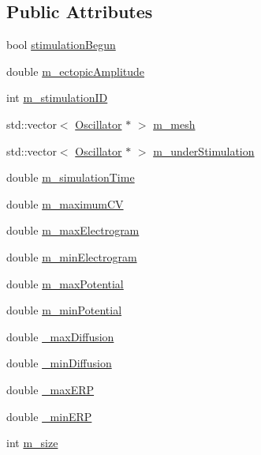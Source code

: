 \subsection*{Public Attributes}
\begin{DoxyCompactItemize}
\item 
bool \hyperlink{class_cardiac_mesh_ac14b1f228c8426e067df4a925824348e}{stimulation\+Begun}
\item 
double \hyperlink{class_cardiac_mesh_a4eeec3a9a09b9bc7e68ca3f7b34ea36c}{m\+\_\+ectopic\+Amplitude}
\item 
int \hyperlink{class_cardiac_mesh_a196d79c37896623ae3957949525c1e1d}{m\+\_\+stimulation\+I\+D}
\item 
std\+::vector$<$ \hyperlink{class_oscillator}{Oscillator} $\ast$ $>$ \hyperlink{class_cardiac_mesh_acd49de8f8f878f45c927d4b75851ced6}{m\+\_\+mesh}
\item 
std\+::vector$<$ \hyperlink{class_oscillator}{Oscillator} $\ast$ $>$ \hyperlink{class_cardiac_mesh_a21749f0b4af8fe59552f97058982f695}{m\+\_\+under\+Stimulation}
\item 
double \hyperlink{class_cardiac_mesh_ad1bf6fc56cbc55f30f9a3855cdafc316}{m\+\_\+simulation\+Time}
\item 
double \hyperlink{class_cardiac_mesh_a48ee051becaeae6be8d4d1b1569645d2}{m\+\_\+maximum\+C\+V}
\item 
double \hyperlink{class_cardiac_mesh_a6856db8aafe754a849a77412106deda9}{m\+\_\+max\+Electrogram}
\item 
double \hyperlink{class_cardiac_mesh_abbc3c7dce57ceccaa344cbbaae6eed21}{m\+\_\+min\+Electrogram}
\item 
double \hyperlink{class_cardiac_mesh_acf9c4e05fe3e0b13f5ca4a849748118d}{m\+\_\+max\+Potential}
\item 
double \hyperlink{class_cardiac_mesh_a7b0d715081602222475ff5c6ae8f2acc}{m\+\_\+min\+Potential}
\item 
double \hyperlink{class_cardiac_mesh_ac7968bb85917957180118029870ce108}{\+\_\+max\+Diffusion}
\item 
double \hyperlink{class_cardiac_mesh_ad5332ffd84e257d3c194b875df2c972f}{\+\_\+min\+Diffusion}
\item 
double \hyperlink{class_cardiac_mesh_a3450acbee174effe8dae1ea148a0ae73}{\+\_\+max\+E\+R\+P}
\item 
double \hyperlink{class_cardiac_mesh_adb965ba95cdba95f197d1e4dc8cb339a}{\+\_\+min\+E\+R\+P}
\item 
int \hyperlink{class_cardiac_mesh_aea33a4be0162859a292958757ac934fc}{m\+\_\+size}

\end{DoxyCompactItemize}
